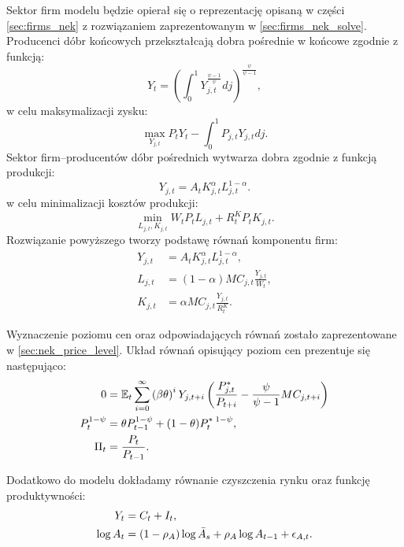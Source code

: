 Sektor firm modelu będzie opierał się o reprezentację opisaną w części \ref{sec:firms_nek} z rozwiązaniem zaprezentowanym w \ref{sec:firms_nek_solve}. Producenci dóbr końcowych przekształcają dobra pośrednie w końcowe zgodnie z funkcją:
\begin{equation}
    Y_t = (\int_0^1 Y_{j,t}^{\frac{\psi-1}{\psi}}dj)^{\frac{\psi}{\psi-1}},
\end{equation}
w celu maksymalizacji zysku:
\begin{equation}
    \max_{Y_{j,t}} P_t Y_t - \int_0^1P_{j,t}Y_{j,t} dj.
\end{equation}
Sektor firm--producentów dóbr pośrednich wytwarza dobra zgodnie z funkcją produkcji:
\begin{equation}
    Y_{j,t} = A_t K_{j,t}^\alpha L_{j,t}^{1-\alpha}.
\end{equation}
w celu minimalizacji kosztów produkcji:
\begin{equation}
    \min_{L_{j,t},K_{j,t}} W_t P_t L_{j,t} + R^K_t P_t K_{j,t}.
\end{equation}
Rozwiązanie powyższego tworzy podstawę równań komponentu firm:
\begin{align}
    Y_{j,t} &= A_t K_{j,t}^\alpha L_{j,t}^{1-\alpha}, \\
    L_{j,t} &= (1-\alpha) MC_{j,t} \frac{Y_{j,t}}{W_t},\\
    K_{j,t} &= \alpha MC_{j,t} \frac{Y_{j,t}}{R^K_t}.
\end{align}

Wyznaczenie poziomu cen oraz odpowiadających równań zostało zaprezentowane w \ref{sec:nek_price_level}. Układ równań opisujący poziom cen prezentuje się następująco:
\begin{align}
    0 &= \mathbb{E}_t \sum_{i=0}^{\infty}\left( \beta \theta \right)^i Y_{j,t+i} \left( \frac{P^*_{j,t}}{P_{t+i}} - \frac{\psi}{\psi - 1} MC_{j,t+i}\right) \\
    P_t^{1-\psi} &= \theta P_{t-1}^{1-\psi} + (1-\theta) P_{t}^{*\;1-\psi}, \\ 
    \Pi_t &= \frac{P_t}{P_{t-1}}.
\end{align}

Dodatkowo do modelu dokładamy równanie czyszczenia rynku oraz funkcję produktywności:
\begin{align}
    Y_t &= C_t + I_t, \\
    \log{A_t} &= (1-\rho_A)\log{\bar{A}_s} + \rho_A \log{A_{t-1}} + \epsilon_{A,t}.
\end{align}

